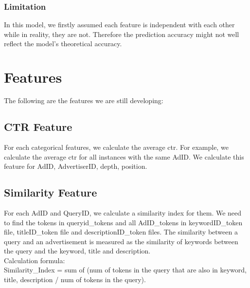 \documentclass[12pt]{article}
\begin{document}
\subsubsection{Limitation }
In this model, we firstly assumed each feature is independent with each other while in reality, they are not. Therefore the prediction accuracy might not well reflect the model’s theoretical accuracy.















\section{Features}
The following are the features we are still developing:\\

\vspace{0.4\baselineskip}



\subsection{CTR Feature}
For each categorical features, we calculate the average ctr. For example, we calculate the average ctr for all instances with the same AdID. We calculate this feature for AdID, AdvertiserID, depth, position. \\


\subsection{Similarity Feature}

For each AdID and QueryID, we calculate a similarity index for them. We need to find the tokens in queryid\_tokens and all AdID\_tokens in keywordID\_token file, titleID\_token file and descriptionID\_token files. 
The similarity between a query and an advertisement is measured as the similarity of keywords between the query and the keyword, title and description. \\

Calculation formula: \\
Similarity\_Index = sum of (num of tokens in the query that are also in keyword, title, description / num of tokens in the query).\\
\end{document}
